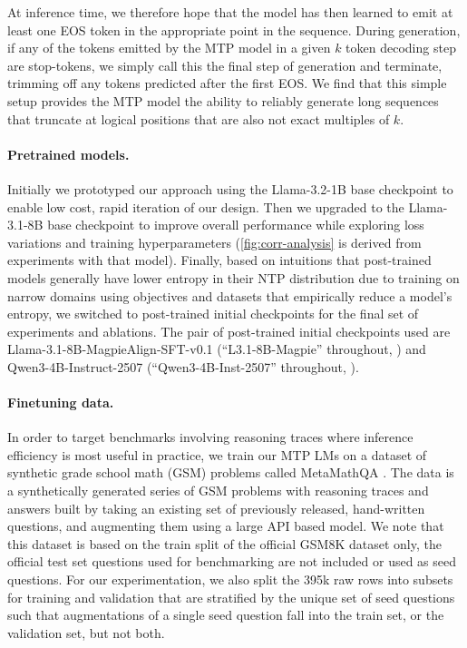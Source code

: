\documentclass{article}
\theoremstyle{plain}
\theoremstyle{definition}
\theoremstyle{remark}
\begin{document}
At inference time, we therefore hope that the model has then learned to emit at least one EOS token in the appropriate point in the sequence. During generation, if any of the tokens emitted by the MTP model in a given $k$ token decoding step are stop-tokens, we simply call this the final step of generation and terminate, trimming off any tokens predicted after the first EOS. We find that this simple setup provides the MTP model the ability to reliably generate long sequences that truncate at logical positions that are also not exact multiples of $k$.

\paragraph{Pretrained models.}

Initially we prototyped our approach using the Llama-3.2-1B base checkpoint \citep{grattafiori2024llama} to enable low cost, rapid iteration of our design. Then we upgraded to the Llama-3.1-8B base checkpoint \citep{grattafiori2024llama} to improve overall performance while exploring loss variations and training hyperparameters (\cref{fig:corr-analysis} is derived from experiments with that model). Finally, based on intuitions that post-trained models generally have lower entropy in their NTP distribution due to training on narrow domains using objectives and datasets that empirically reduce a model's entropy, we switched to post-trained initial checkpoints for the final set of experiments and ablations. The pair of post-trained initial checkpoints used are Llama-3.1-8B-MagpieAlign-SFT-v0.1 (``L3.1-8B-Magpie'' throughout, \citet{xu2024magpie}) and Qwen3-4B-Instruct-2507 (``Qwen3-4B-Inst-2507'' throughout, \citet{yang2025qwen3}).

\paragraph{Finetuning data.}

In order to target benchmarks involving reasoning traces where inference efficiency is most useful in practice, we train our MTP LMs on a dataset of synthetic grade school math (GSM) problems called MetaMathQA \citep{yu2023metamath}. The data is a synthetically generated series of GSM problems with reasoning traces and answers built by taking an existing set of previously released, hand-written questions, and augmenting them using a large API based model. We note that this dataset is based on the train split of the official GSM8K dataset only, the official test set questions used for benchmarking are not included or used as seed questions. For our experimentation, we also split the 395k raw rows into subsets for training and validation that are stratified by the unique set of seed questions such that augmentations of a single seed question fall into the train set, or the validation set, but not both.
\end{document}
